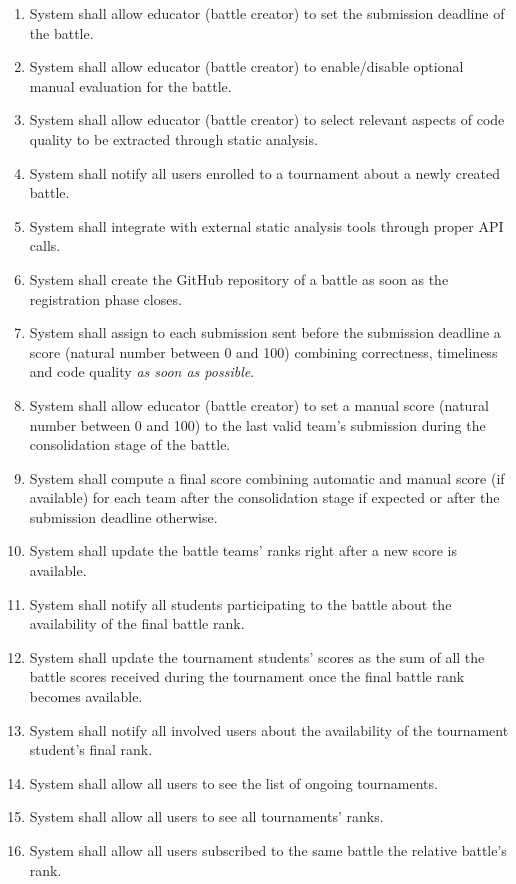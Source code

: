 \begin{enumerate}[label=$\bullet$ \textbf{R\arabic*:}]
    \item System shall allow educator (battle creator) to set the submission deadline of the battle.
    \item System shall allow educator (battle creator) to enable/disable optional manual evaluation for the battle.
    \item System shall allow educator (battle creator) to select relevant aspects of code quality to be extracted through static analysis.
    \item System shall notify all users enrolled to a tournament about a newly created battle.
    \item System shall integrate with external static analysis tools through proper API calls.
    \item System shall create the GitHub repository of a battle as soon as the registration phase closes.
    \item System shall assign to each submission sent before the submission deadline a score (natural number between 0 and 100) combining correctness, timeliness and code quality \textit{as soon as possible}.
    \item System shall allow educator (battle creator) to set a manual score (natural number between 0 and 100) to the last valid team’s submission during the consolidation stage of the battle.
    \item System shall compute a final score combining automatic and manual score (if available) for each team after the consolidation stage if expected or after the submission deadline otherwise.
    \item System shall update the battle teams’ ranks right after a new score is available.
    \item System shall notify all students participating to the battle about the availability of the final battle rank.
    \item System shall update the tournament students’ scores as the sum of all the battle scores received during the tournament once the final battle rank becomes available.
    \item System shall notify all involved users about the availability of the tournament student’s final rank.
    \item System shall allow all users to see the list of ongoing tournaments.
    \item System shall allow all users to see all tournaments’ ranks.
    \item System shall allow all users subscribed to the same battle the relative battle's rank.

\end{enumerate}
